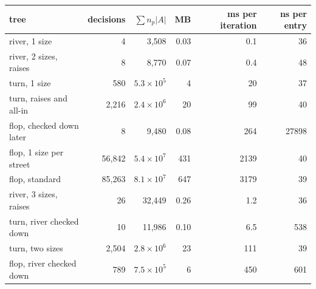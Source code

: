 \begin{tabular}{lrrrrr}
\toprule
tree & decisions & $\sum n_p|A|$ & MB & ms per iteration & ns per entry \\ \midrule
river, 1 size & 4 & 3,508 & 0.03 & 0.1 & 36 \\
river, 2 sizes, raises & 8 & 8,770 & 0.07 & 0.4 & 48 \\
turn, 1 size & 580 & $5.3\times10^{5}$ & 4 & 20 & 37 \\
turn, raises and all-in & 2,216 & $2.4\times10^{6}$ & 20 & 99 & 40 \\
flop, checked down later & 8 & 9,480 & 0.08 & 264 & 27898 \\
flop, 1 size per street & 56,842 & $5.4\times10^{7}$ & 431 & 2139 & 40 \\
flop, standard & 85,263 & $8.1\times10^{7}$ & 647 & 3179 & 39 \\
river, 3 sizes, raises & 26 & 32,449 & 0.26 & 1.2 & 36 \\
turn, river checked down & 10 & 11,986 & 0.10 & 6.5 & 538 \\
turn, two sizes & 2,504 & $2.8\times10^{6}$ & 23 & 111 & 39 \\
flop, river checked down & 789 & $7.5\times10^{5}$ & 6 & 450 & 601 \\
\bottomrule
\end{tabular}
